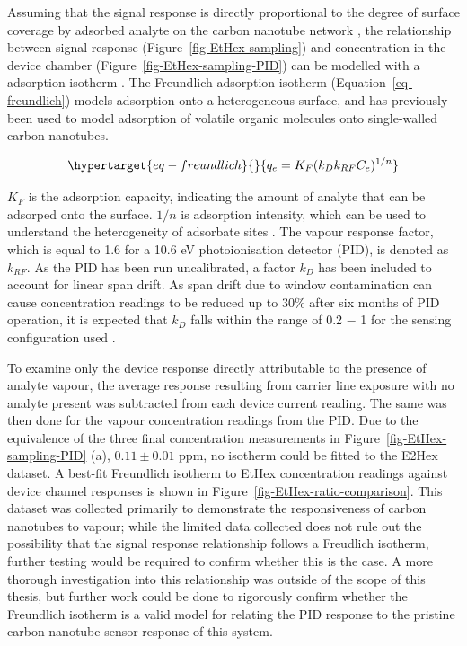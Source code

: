 \documentclass[
  a4paper,
]{scrbook}
\begin{document}
Assuming that the signal response is directly proportional to the degree
of surface coverage by adsorbed analyte on the carbon nanotube network
\autocite{Lee2005}, the relationship between signal response
(Figure~\ref{fig-EtHex-sampling}) and concentration in the device
chamber (Figure~\ref{fig-EtHex-sampling-PID}) can be modelled with a
adsorption isotherm \autocite{Agnihotri2005}. The Freundlich adsorption
isotherm (Equation~\ref{eq-freundlich}) models adsorption onto a
heterogeneous surface, and has previously been used to model adsorption
of volatile organic molecules onto single-walled carbon nanotubes.

\begin{equation}\protect\hypertarget{eq-freundlich}{}{
q_e = K_F(k_Dk_{RF}C_e)^{1/n}
}\label{eq-freundlich}\end{equation}

\(K_F\) is the adsorption capacity, indicating the amount of analyte
that can be adsorped onto the surface. \(1/n\) is adsorption intensity,
which can be used to understand the heterogeneity of adsorbate sites
\autocite{Ayawei2017,Sabzehmeidani2021}. The vapour response factor,
which is equal to 1.6 for a 10.6 eV photoionisation detector (PID), is
denoted as \(k_{RF}\). As the PID has been run uncalibrated, a factor
\(k_{D}\) has been included to account for linear span drift. As span
drift due to window contamination can cause concentration readings to be
reduced up to 30\% after six months of PID operation, it is expected
that \(k_{D}\) falls within the range of 0.2 \(-\) 1 for the sensing
configuration used \autocite{PIDmanual,Ionscience}.

To examine only the device response directly attributable to the
presence of analyte vapour, the average response resulting from carrier
line exposure with no analyte present was subtracted from each device
current reading. The same was then done for the vapour concentration
readings from the PID. Due to the equivalence of the three final
concentration measurements in Figure~\ref{fig-EtHex-sampling-PID} (a),
\(0.11\pm0.01\) ppm, no isotherm could be fitted to the E2Hex dataset. A
best-fit Freundlich isotherm to EtHex concentration readings against
device channel responses is shown in
Figure~\ref{fig-EtHex-ratio-comparison}. This dataset was collected
primarily to demonstrate the responsiveness of carbon nanotubes to
vapour; while the limited data collected does not rule out the
possibility that the signal response relationship follows a Freudlich
isotherm, further testing would be required to confirm whether this is
the case. A more thorough investigation into this relationship was
outside of the scope of this thesis, but further work could be done to
rigorously confirm whether the Freundlich isotherm is a valid model for
relating the PID response to the pristine carbon nanotube sensor
response of this system.
\end{document}
